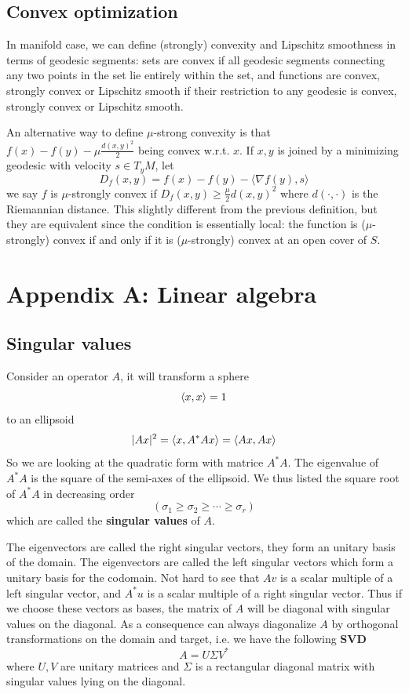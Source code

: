 \documentclass[a4paper]{mynotes}
\begin{document}
\section{Convex optimization}



In manifold case, we can define (strongly) convexity and Lipschitz smoothness in terms of geodesic segments: sets are convex if all geodesic segments connecting any two points in the set lie entirely within the set, and functions are convex, strongly convex or Lipschitz smooth if their restriction to any geodesic is convex, strongly convex or Lipschitz smooth. 

An alternative way to define $\mu$-strong convexity is that $f(x)-f(y)-\mu\frac{d(x,y)^2}{2}$ being convex w.r.t. $x$. If $x,y$ is joined by a minimizing geodesic with velocity $s\in T_yM$, let $$D_f(x,y)=f(x)-f(y)-\langle \nabla f(y),s\rangle$$ we say $f$ is $\mu$-strongly convex if $D_f(x,y)\ge \frac{\mu}{2}d(x,y)^2$ where $d(\cdot,\cdot)$ is the Riemannian distance. This slightly different from the previous definition, but they are equivalent since the condition is essentially local: the function is ($\mu$-strongly) convex if and only if it is ($\mu$-strongly) convex at an open cover of $S$.


\appendix
\chapter{Appendix A: Linear algebra}
\section{Singular values}


Consider an operator $A$, it will transform a sphere $$\left\langle x,x\right\rangle=1$$ to an ellipsoid $$|Ax|^2=\left\langle x,A^*Ax\right\rangle=\left\langle Ax,Ax\right\rangle$$ So we are looking at the quadratic form with matrice $A^*A$. The eigenvalue of $A^*A$ is the square of the semi-axes of the ellipsoid. We thus listed the square root of $A^*A$ in decreasing order $$(\sigma_1 \ge \sigma_2 \ge \cdots \ge \sigma_r)$$ which are called the \textbf{singular values } of $A$. 


The eigenvectors are called the right singular vectors, they form an unitary basis of the domain.  The eigenvectors are called the left singular vectors which form a unitary basis for the codomain. Not hard to see that $Av$ is a scalar multiple of a left singular vector, and $A^*u$ is a scalar multiple of a right singular vector. Thus if we choose these vectors as bases, the matrix of $A$ will be diagonal with singular values on the diagonal. As a consequence can always diagonalize $A$ by orthogonal transformations on the domain and target, i.e.  we have the following \textbf{SVD}$$A=U\Sigma V^*$$ where $U,V$ are unitary matrices and $\Sigma$ is a rectangular diagonal matrix with singular values lying on the 
diagonal. 
\end{document}

